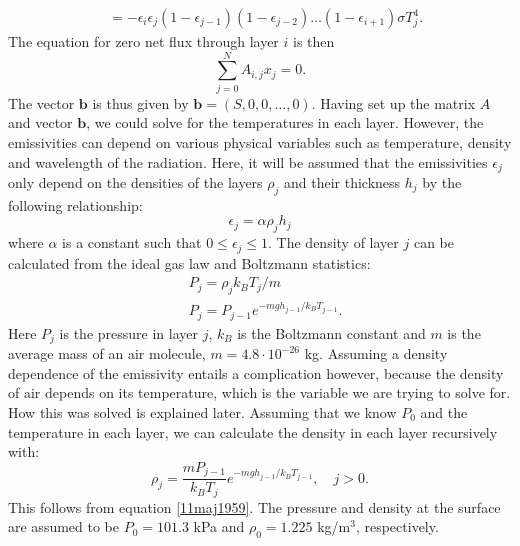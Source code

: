 \documentclass[twocolumn]{article}
\begin{document}
\begin{large}
\begin{equation}
\begin{split}
        &= -\epsilon_i\epsilon_j(1-\epsilon_{j-1})(1-\epsilon_{j-2})\dots(1-\epsilon_{i+1})\sigma T_j^4.
    \end{split}
\end{equation}
The equation for zero net flux through layer $i$ is then
\begin{equation}
    \sum_{j=0}^{N}A_{i,j}x_j = 0.
\end{equation}
The vector $\mathbf{b}$ is thus given by $\mathbf{b} = (S,0,0,\dots,0)$. Having set up the matrix $A$ and vector $\mathbf{b}$, we could solve for the temperatures in each layer. However, the emissivities can depend on various physical variables such as temperature, density and wavelength of the radiation. Here, it will be assumed that the emissivities $\epsilon_j$ only depend on the densities of the layers $\rho_j$ and their thickness $h_j$ by the following relationship:
\begin{equation}
    \label{11maj1708}
    \epsilon_j = \alpha\rho_jh_j
\end{equation}
where $\alpha$ is a constant such that $0\leq\epsilon_j\leq 1$. The density of layer $j$ can be calculated from the ideal gas law and Boltzmann statistics:
\begin{equation}
    \label{11maj1959}
    \begin{split}
        &P_j = \rho_jk_BT_j/m \\ 
        &P_j = P_{j-1}e^{-mgh_{j-1}/k_BT_{j-1}}.
    \end{split}
\end{equation}
Here $P_j$ is the pressure in layer $j$, $k_B$ is the Boltzmann constant and $m$ is the average mass of an air molecule, $m=4.8\cdot 10^{-26}$ kg. Assuming a density dependence of the emissivity entails a complication however, because the density of air depends on its temperature, which is the variable we are trying to solve for. How this was solved is explained later. Assuming that we know $P_0$ and the temperature in each layer, we can calculate the density in each layer recursively with:
\begin{equation}
    \label{11maj1707}
    \rho_j = \frac{mP_{j-1}}{k_BT_j}e^{-mgh_{j-1}/k_BT_{j-1}},\quad j>0.
\end{equation}
This follows from equation \eqref{11maj1959}. The pressure and density at the surface are assumed to be $P_0=101.3$ kPa and $\rho_0=1.225$ kg/m$^3$, respectively.


\end{large}
\end{document}
